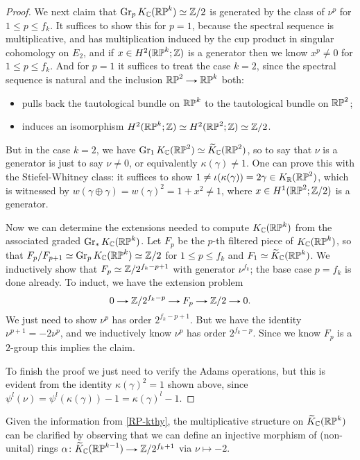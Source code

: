\begin{proof}
  We next claim that $\operatorname{Gr}_pK_{\mathbb{C}}(\mathbb{RP}^k) \simeq \mathbb{Z}/2$ is generated by
  the class of $\nu^p$ for $1 \le p \le f_k$. It suffices to show this
  for $p=1$, because the spectral sequence is multiplicative, and has
  multiplication induced by the cup product in singular cohomology on
  $E_2$, and if $x \in H^2(\mathbb{RP}^k;\mathbb{Z})$ is a generator then we know
  $x^p \ne 0$ for $1 \le p \le f_k$. And for $p=1$ it suffices to
  treat the case $k=2$, since the spectral sequence is natural and the
  inclusion $\RP^2 \to \RP^k$ both:
  \begin{itemize}
  \item pulls back the tautological bundle on $\mathbb{RP}^k$ to the
    tautological bundle on $\mathbb{RP}^2$;
  \item induces an isomorphism $H^2(\mathbb{RP}^k;\mathbb{Z}) \simeq H^2(\mathbb{RP}^2;\mathbb{Z})
    \simeq \mathbb{Z}/2$.
  \end{itemize}
  But in the case $k=2$, we have $ \operatorname{Gr}_1K_{\mathbb{C}}(\mathbb{RP}^2) \simeq
  \widetilde K_{\mathbb{C}}(\mathbb{RP}^2)$, so to say that $\nu$ is a generator is just to say
  $\nu \ne 0$, or equivalently $\kappa(\gamma) \ne 1$. One can prove
  this with the Stiefel-Whitney class: it suffices to show $1 \ne
  \iota(\kappa(\gamma)) = 2\gamma \in K_{\mathbb{R}}(\mathbb{RP}^2)$, which is
  witnessed by $w(\gamma\oplus\gamma) = w(\gamma)^2 = 1+x^2 \ne 1$,
  where $x \in H^1(\mathbb{RP}^2;\mathbb{Z}/2)$ is a generator.

  Now we can determine the extensions needed to compute $K_{\mathbb{C}}(\mathbb{RP}^k)$
  from the associated graded $\operatorname{Gr}_*K_{\mathbb{C}}(\mathbb{RP}^k)$. Let $F_p$ be the
  $p$-th filtered piece of $K_{\mathbb{C}}(\mathbb{RP}^k)$, so that $F_p/F_{p+1} \simeq
  \operatorname{Gr}_pK_{\mathbb{C}}(\mathbb{RP}^k) \simeq \mathbb{Z}/2$ for $1 \le p \le f_k$ and $F_1 \simeq
  \widetilde K_{\mathbb{C}}(\mathbb{RP}^k)$. We inductively show that $F_p \simeq
  \mathbb{Z}/2^{f_k-p+1}$ with generator $\nu^{f_k}$; the base case $p=f_k$ is
  done already. To induct, we have the extension problem
  \[
  0 \to \Z/2^{f_k-p} \to F_p \to \Z/2 \to 0.
  \]
  We just need to show $\nu^p$ has order $2^{f_k-p+1}$. But we have
  the identity $\nu^{p+1} = -2\nu^p$, and we inductively know $\nu^p$
  has order $2^{f_k-p}$. Since we know $F_p$ is a $2$-group this
  implies the claim.

  To finish the proof we just need to verify the Adams operations, but
  this is evident from the identity $\kappa(\gamma)^2 = 1$ shown
  above, since $\psi^l(\nu) = \psi^l(\kappa(\gamma)) - 1 =
  \kappa(\gamma)^l - 1$.
\end{proof}

\begin{remark}
  \label{RP-ringhom}
  Given the information from \eqref{RP-kthy}, the multiplicative
  structure on $\widetilde K_{\mathbb{C}}(\mathbb{RP}^k)$ can be clarified by observing that we
  can define an injective morphism of (non-unital) rings $\alpha \c
  \til K_\C(\RP^{k-1}) \to \Z/2^{f_k+1}$ via $\nu \mapsto -2$.
\end{remark}

